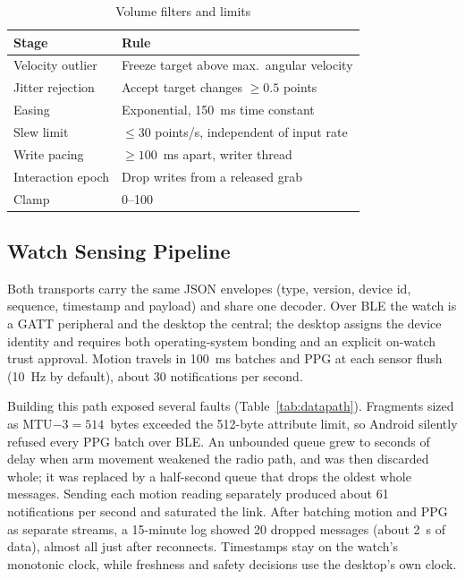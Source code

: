 \begin{table}[t]
  \centering
  \caption{Volume filters and limits}
  \label{tab:filters}
  \small
  \begin{tabular}{@{}ll@{}}
    \toprule
    Stage & Rule \\
    \midrule
    Velocity outlier & Freeze target above max.\ angular velocity \\
    Jitter rejection & Accept target changes $\geq 0.5$ points \\
    Easing & Exponential, 150~ms time constant \\
    Slew limit & $\leq 30$ points/s, independent of input rate \\
    Write pacing & $\geq 100$~ms apart, writer thread \\
    Interaction epoch & Drop writes from a released grab \\
    Clamp & 0--100 \\
    \bottomrule
  \end{tabular}
\end{table}

\subsection{Watch Sensing Pipeline}

Both transports carry the same JSON envelopes (type, version, device id, sequence, timestamp and payload) and share one decoder. Over BLE the watch is a GATT peripheral and the desktop the central; the desktop assigns the device identity and requires both operating-system bonding and an explicit on-watch trust approval. Motion travels in 100~ms batches and PPG at each sensor flush (10~Hz by default), about 30 notifications per second.

Building this path exposed several faults (Table~\ref{tab:datapath}). Fragments sized as MTU$-3 = 514$~bytes exceeded the 512-byte attribute limit, so Android silently refused every PPG batch over BLE. An unbounded queue grew to seconds of delay when arm movement weakened the radio path, and was then discarded whole; it was replaced by a half-second queue that drops the oldest whole messages. Sending each motion reading separately produced about 61 notifications per second and saturated the link. After batching motion and PPG as separate streams, a 15-minute log showed 20 dropped messages (about 2~s of data), almost all just after reconnects. Timestamps stay on the watch's monotonic clock, while freshness and safety decisions use the desktop's own clock.

